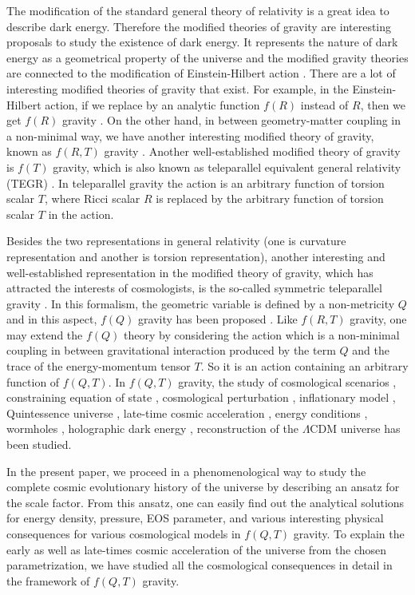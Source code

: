 \documentclass[showpacs,aps,amssymb,preprintnumbers,prd,amsmath,floatfix]{revtex4}
\begin{document}
The modification of the standard general theory of relativity is a great idea to describe dark energy. Therefore the modified theories of gravity are interesting proposals to study the existence of dark energy. It represents the nature of dark energy as a geometrical property of the universe and the modified gravity theories are connected to the modification of Einstein-Hilbert action \cite{Palia}. There are a lot of interesting modified theories of gravity that exist. For example, in the Einstein-Hilbert action, if we replace by an analytic function $f(R)$ instead of $R$, then we get $f(R)$ gravity \cite{Soti}. On the other hand, in between geometry-matter coupling in a non-minimal way, we have another interesting modified theory of gravity, known as $f(R,T)$ gravity \cite{Har}. Another well-established modified theory of gravity is $f(T)$ gravity, which is also known as teleparallel equivalent general relativity (TEGR) \cite{Bengochea,Ferraro,Linder1,Cai}. In teleparallel gravity the action is an arbitrary function of torsion scalar $T$, where Ricci scalar $R$ is replaced by the arbitrary function of torsion scalar $T$ in the action.

Besides the two representations in general relativity (one is curvature representation and another is torsion representation), another interesting and well-established representation in the modified theory of gravity, which has attracted the interests of cosmologists, is the so-called symmetric teleparallel gravity \cite{Nester}. In this formalism, the geometric variable is defined by a non-metricity $Q$ and in this aspect, $f(Q)$ gravity has been proposed \cite{Lavinia}. Like $f(R,T)$ gravity, one may extend the $f(Q)$ theory by considering the action which is a non-minimal coupling in between gravitational interaction produced by the term $Q$ and the trace of the energy-momentum tensor $T$. So it is an action containing an arbitrary function of $f(Q,T)$. In $f(Q,T)$ gravity, the study of cosmological scenarios \cite{Nisha,Xu,Gad}, constraining equation of state \cite{Simran3}, cosmological perturbation \cite{Antonio}, inflationary model \cite{Maryam}, Quintessence universe \cite{Koussour}, late-time cosmic acceleration \cite{Lalke}, energy conditions \cite{Simran1,Simran2}, wormholes \cite{Tayde}, holographic dark energy \cite{Asutosh}, reconstruction of the $\Lambda$CDM universe \cite{gaurav} has been studied.

In the present paper, we proceed in a phenomenological way to study the complete cosmic evolutionary history of the universe by describing an ansatz for the scale factor. From this ansatz, one can easily find out the analytical solutions for energy density, pressure, EOS parameter, and various interesting physical consequences for various cosmological models in $f(Q,T)$ gravity. To explain the early as well as late-times cosmic acceleration of the universe from the chosen parametrization, we have studied all the cosmological consequences in detail in the framework of $f(Q,T)$ gravity. 
\end{document}
